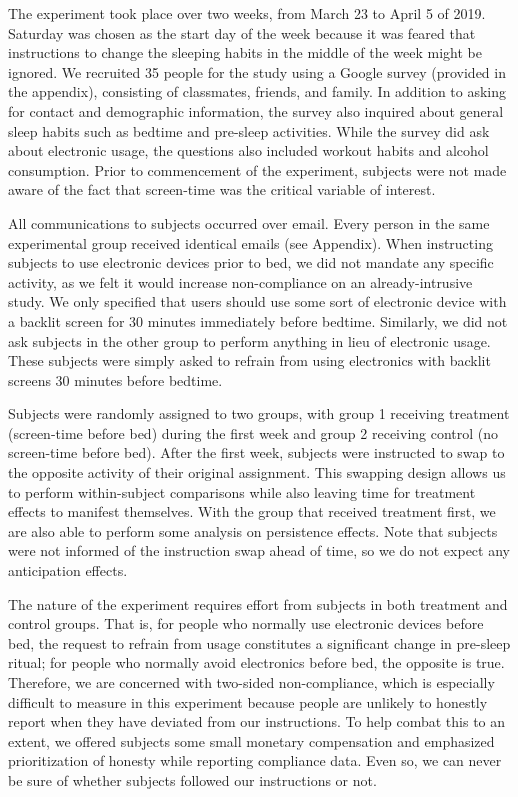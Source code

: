 \documentclass[12pt,]{article}
\begin{document}
The experiment took place over two weeks, from March 23 to April 5 of
2019. Saturday was chosen as the start day of the week because it was
feared that instructions to change the sleeping habits in the middle of
the week might be ignored. We recruited 35 people for the study using a
Google survey (provided in the appendix), consisting of classmates,
friends, and family. In addition to asking for contact and demographic
information, the survey also inquired about general sleep habits such as
bedtime and pre-sleep activities. While the survey did ask about
electronic usage, the questions also included workout habits and alcohol
consumption. Prior to commencement of the experiment, subjects were not
made aware of the fact that screen-time was the critical variable of
interest.

All communications to subjects occurred over email. Every person in the
same experimental group received identical emails (see Appendix). When
instructing subjects to use electronic devices prior to bed, we did not
mandate any specific activity, as we felt it would increase
non-compliance on an already-intrusive study. We only specified that
users should use some sort of electronic device with a backlit screen
for 30 minutes immediately before bedtime. Similarly, we did not ask
subjects in the other group to perform anything in lieu of electronic
usage. These subjects were simply asked to refrain from using
electronics with backlit screens 30 minutes before bedtime.

Subjects were randomly assigned to two groups, with group 1 receiving
treatment (screen-time before bed) during the first week and group 2
receiving control (no screen-time before bed). After the first week,
subjects were instructed to swap to the opposite activity of their
original assignment. This swapping design allows us to perform
within-subject comparisons while also leaving time for treatment effects
to manifest themselves. With the group that received treatment first, we
are also able to perform some analysis on persistence effects. Note that
subjects were not informed of the instruction swap ahead of time, so we
do not expect any anticipation effects.

The nature of the experiment requires effort from subjects in both
treatment and control groups. That is, for people who normally use
electronic devices before bed, the request to refrain from usage
constitutes a significant change in pre-sleep ritual; for people who
normally avoid electronics before bed, the opposite is true. Therefore,
we are concerned with two-sided non-compliance, which is especially
difficult to measure in this experiment because people are unlikely to
honestly report when they have deviated from our instructions. To help
combat this to an extent, we offered subjects some small monetary
compensation and emphasized prioritization of honesty while reporting
compliance data. Even so, we can never be sure of whether subjects
followed our instructions or not.
\end{document}
